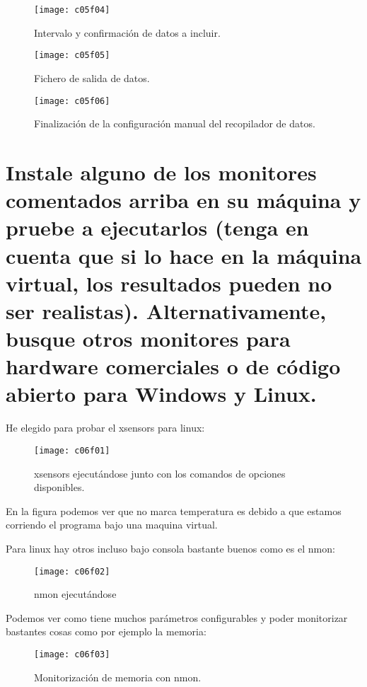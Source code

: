 \begin{figure}[H]
	\centering
	\texttt{[image: c05f04]}
	\caption{Intervalo y confirmación de datos a incluir.}
	\label{fig:c05f04}
\end{figure}
\begin{figure}[H]
	\centering
	\texttt{[image: c05f05]}
	\caption{Fichero de salida de datos.}
	\label{fig:c05f05}
\end{figure}
\begin{figure}[H]
	\centering
	\texttt{[image: c05f06]}
	\caption{Finalización de la configuración manual del recopilador de datos.}
	\label{fig:c05f06}
\end{figure}

\clearpage


\section{Instale alguno de los monitores comentados arriba en su máquina y pruebe a ejecutarlos (tenga en cuenta que si lo hace en la máquina virtual, los resultados pueden no ser realistas). Alternativamente,	busque otros monitores para hardware comerciales o de código abierto para Windows y Linux.}

He elegido para probar el xsensors para linux:

\begin{figure}[H]
	\centering
	\texttt{[image: c06f01]}
	\caption{xsensors ejecutándose junto con los comandos de opciones disponibles.}
	\label{fig:c06f01}
\end{figure}

En la figura podemos ver que no marca temperatura es debido a que estamos corriendo el programa bajo una maquina virtual.

Para linux hay otros incluso bajo consola bastante buenos como es el nmon:
\begin{figure}[H]
	\centering
	\texttt{[image: c06f02]}
	\caption{nmon ejecutándose}
	\label{fig:c06f02}
\end{figure}

Podemos ver como tiene muchos parámetros configurables y poder monitorizar bastantes cosas como por ejemplo la memoria:
\begin{figure}[H]
	\centering
	\texttt{[image: c06f03]}
	\caption{Monitorización de memoria con nmon.}
	\label{fig:c06f03}
\end{figure}

